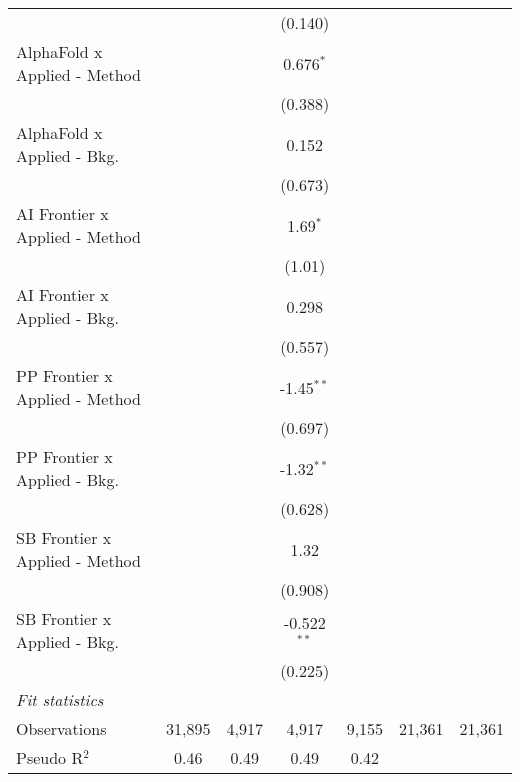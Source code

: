 \begin{tabular}{lcccccc}
                                  &             &              & (0.140)       &         &        &   \\   
   AlphaFold x Applied - Method   &             &              & 0.676$^{*}$   &         &        &   \\   
                                  &             &              & (0.388)       &         &        &   \\   
   AlphaFold x Applied - Bkg.     &             &              & 0.152         &         &        &   \\   
                                  &             &              & (0.673)       &         &        &   \\   
   AI Frontier x Applied - Method &             &              & 1.69$^{*}$    &         &        &   \\   
                                  &             &              & (1.01)        &         &        &   \\   
   AI Frontier x Applied - Bkg.   &             &              & 0.298         &         &        &   \\   
                                  &             &              & (0.557)       &         &        &   \\   
   PP Frontier x Applied - Method &             &              & -1.45$^{**}$  &         &        &   \\   
                                  &             &              & (0.697)       &         &        &   \\   
   PP Frontier x Applied - Bkg.   &             &              & -1.32$^{**}$  &         &        &   \\   
                                  &             &              & (0.628)       &         &        &   \\   
   SB Frontier x Applied - Method &             &              & 1.32          &         &        &   \\   
                                  &             &              & (0.908)       &         &        &   \\   
   SB Frontier x Applied - Bkg.   &             &              & -0.522$^{**}$ &         &        &   \\   
                                  &             &              & (0.225)       &         &        &   \\   
   \midrule
   \emph{Fit statistics}\\
   Observations                   & 31,895      & 4,917        & 4,917         & 9,155   & 21,361 & 21,361\\  
   Pseudo R$^2$                   & 0.46        & 0.49         & 0.49          & 0.42    &        & \\  
   

\end{tabular}
